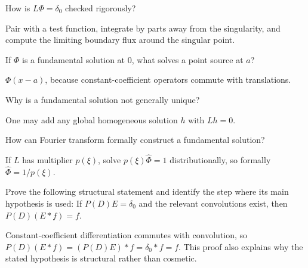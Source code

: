 \begin{problem}\label{prob:iii24-problem-05}
How is \(L\Phi=\delta_0\) checked rigorously?
\end{problem}
\begin{solution}
Pair with a test function, integrate by parts away from the singularity,
and compute the limiting boundary flux around the singular point.
\end{solution}

\begin{problem}\label{prob:iii24-problem-06}
If \(\Phi\) is a fundamental solution at \(0\), what solves a point source at \(a\)?
\end{problem}
\begin{solution}
\(\Phi(x-a)\), because constant-coefficient operators commute with
translations.
\end{solution}

\begin{problem}[Nonuniqueness]\label{prob:iii24-problem-07}
Why is a fundamental solution not generally unique?
\end{problem}
\begin{solution}
One may add any global homogeneous solution \(h\) with \(Lh=0\).
\end{solution}

\begin{problem}\label{prob:iii24-problem-08}
How can Fourier transform formally construct a fundamental solution?
\end{problem}
\begin{solution}
If \(L\) has multiplier \(p(\xi)\), solve
\(p(\xi)\widehat\Phi=1\) distributionally, so formally
\(\widehat\Phi=1/p(\xi)\).
\end{solution}

\begin{problem}\label{prob:iii24-problem-09}
Prove the following structural statement and identify the step where its main hypothesis is used: If $P(D)E=\delta_0$ and the relevant convolutions exist, then $P(D)(E*f)=f$.
\end{problem}
\begin{solution}
Constant-coefficient differentiation commutes with convolution, so $P(D)(E*f)=(P(D)E)*f=\delta_0*f=f$. This proof also explains why the stated hypothesis is structural rather than cosmetic.
\end{solution}


